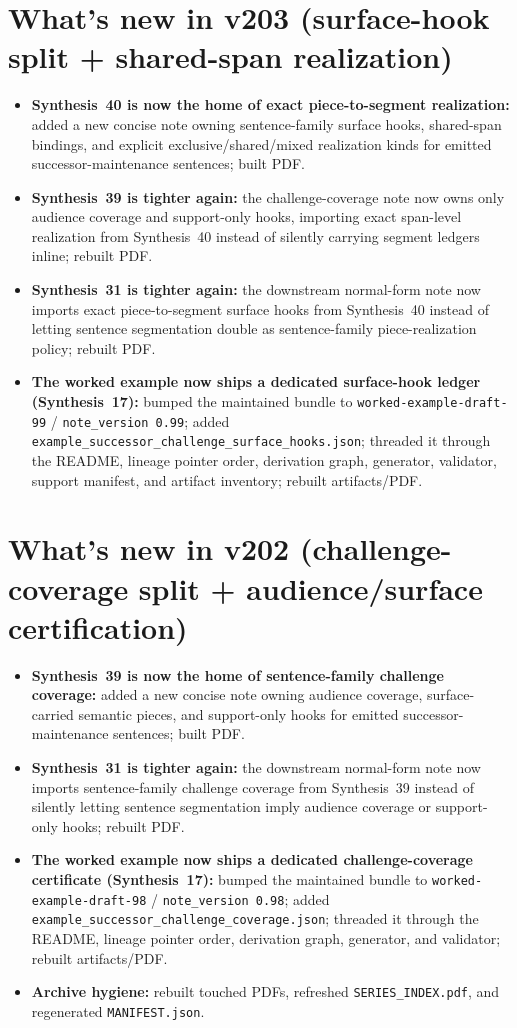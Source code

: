 \documentclass[11pt]{article}
\begin{document}
\section{What's new in v203 (surface-hook split + shared-span realization)}
\begin{itemize}[leftmargin=*]
\item \textbf{Synthesis~40 is now the home of exact piece-to-segment realization:} added a new concise note owning sentence-family surface hooks, shared-span bindings, and explicit exclusive/shared/mixed realization kinds for emitted successor-maintenance sentences; built PDF.
\item \textbf{Synthesis~39 is tighter again:} the challenge-coverage note now owns only audience coverage and support-only hooks, importing exact span-level realization from Synthesis~40 instead of silently carrying segment ledgers inline; rebuilt PDF.
\item \textbf{Synthesis~31 is tighter again:} the downstream normal-form note now imports exact piece-to-segment surface hooks from Synthesis~40 instead of letting sentence segmentation double as sentence-family piece-realization policy; rebuilt PDF.
\item \textbf{The worked example now ships a dedicated surface-hook ledger (Synthesis~17):} bumped the maintained bundle to \texttt{worked-example-draft-99} / \texttt{note\_version 0.99}; added \texttt{example\_successor\_challenge\_surface\_hooks.json}; threaded it through the README, lineage pointer order, derivation graph, generator, validator, support manifest, and artifact inventory; rebuilt artifacts/PDF.
\end{itemize}


\section{What's new in v202 (challenge-coverage split + audience/surface certification)}
\begin{itemize}[leftmargin=*]
\item \textbf{Synthesis~39 is now the home of sentence-family challenge coverage:} added a new concise note owning audience coverage, surface-carried semantic pieces, and support-only hooks for emitted successor-maintenance sentences; built PDF.
\item \textbf{Synthesis~31 is tighter again:} the downstream normal-form note now imports sentence-family challenge coverage from Synthesis~39 instead of silently letting sentence segmentation imply audience coverage or support-only hooks; rebuilt PDF.
\item \textbf{The worked example now ships a dedicated challenge-coverage certificate (Synthesis~17):} bumped the maintained bundle to \texttt{worked-example-draft-98} / \texttt{note\_version 0.98}; added \texttt{example\_successor\_challenge\_coverage.json}; threaded it through the README, lineage pointer order, derivation graph, generator, and validator; rebuilt artifacts/PDF.
\item \textbf{Archive hygiene:} rebuilt touched PDFs, refreshed \texttt{SERIES\_INDEX.pdf}, and regenerated \texttt{MANIFEST.json}.
\end{itemize}
\end{document}
